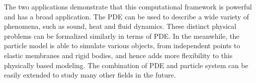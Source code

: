 The two applications demonstrate that this computational framework is powerful and has a broad application. The PDE can be used to describe a wide variety of phenomena, such as sound, heat and fluid dynamics. These distinct physical problems can be formalized similarly in terms of PDE.
In the meanwhile, the particle model is able to simulate various objects, from independent points to elastic membranes and rigid bodies, and hence adds more flexibility to this physically based modeling. The combination of PDE and particle system can be easily extended to study many other fields in the future.